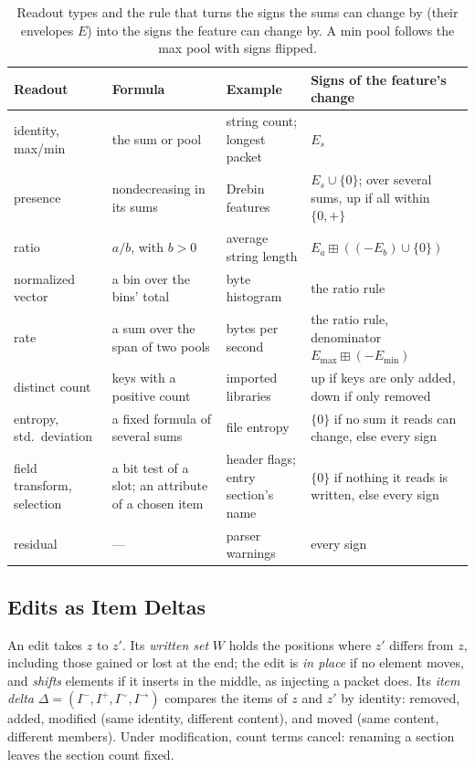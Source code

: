\begin{table}[t]
  \caption{Readout types and the rule that turns the signs the sums can change by (their envelopes $E$) into the signs
  the feature can change by. A min pool follows the max pool with signs flipped.}
  \label{tab:fw:readouts}
  \small
  \begin{tabular}{@{}p{}p{}p{}p{}@{}}
    \toprule
    Readout & Formula & Example & Signs of the feature's change \\
    \midrule
    identity, max/min & the sum or pool & string count; longest packet & $E_s$ \\
    presence & nondecreasing in its sums & Drebin features & $E_s \cup \{0\}$; over several sums, up if all within $\{0,+\}$ \\
    ratio & $a/b$, with $b > 0$ & average string length & $E_a \boxplus ((-E_b) \cup \{0\})$ \\
    normalized vector & a bin over the bins' total & byte histogram & the ratio rule \\
    rate & a sum over the span of two pools & bytes per second & the ratio rule, denominator $E_{\max} \boxplus (-E_{\min})$ \\
    distinct count & keys with a positive count & imported libraries & up if keys are only added, down if only removed \\
    entropy, std.\ deviation & a fixed formula of several sums & file entropy & $\{0\}$ if no sum it reads can change, else every sign \\
    field transform, selection & a bit test of a slot; an attribute of a chosen item & header flags; entry section's name & $\{0\}$ if nothing it reads is written, else every sign \\
    residual & --- & parser warnings & every sign \\
    \bottomrule
  \end{tabular}
\end{table}

\subsection{Edits as Item Deltas}
\label{sec:fw:edits}

An edit takes $z$ to $z'$. Its \emph{written set} $W$ holds the positions where $z'$ differs from $z$, including
those gained or lost at the end; the edit is \emph{in place} if no element moves, and \emph{shifts} elements if it
inserts in the middle, as injecting a packet does. Its \emph{item
delta} $\Delta = (I^-, I^+, I^\sim, I^\to)$ compares the items of $z$ and $z'$ by identity: removed, added, modified
(same identity, different content), and moved (same content, different members). Under modification, count terms
cancel: renaming a section leaves the section count fixed.


